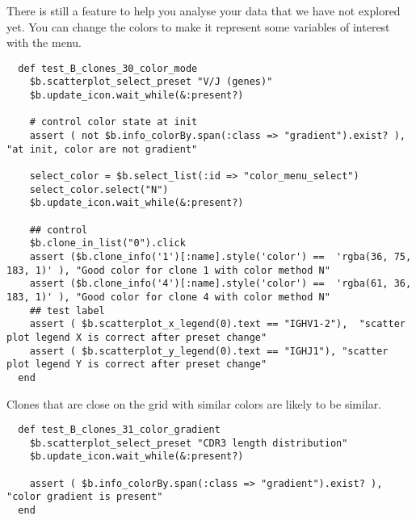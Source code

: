 There is still a feature to help you analyse your data that we have not
explored yet.
You can change the colors to make it represent some variables of interest
with the  menu.
\begin{verbatim}
  def test_B_clones_30_color_mode
    $b.scatterplot_select_preset "V/J (genes)"
    $b.update_icon.wait_while(&:present?)

    # control color state at init
    assert ( not $b.info_colorBy.span(:class => "gradient").exist? ), "at init, color are not gradient"

    select_color = $b.select_list(:id => "color_menu_select")
    select_color.select("N")
    $b.update_icon.wait_while(&:present?)
    
    ## control
    $b.clone_in_list("0").click
    assert ($b.clone_info('1')[:name].style('color') ==  'rgba(36, 75, 183, 1)' ), "Good color for clone 1 with color method N"
    assert ($b.clone_info('4')[:name].style('color') ==  'rgba(61, 36, 183, 1)' ), "Good color for clone 4 with color method N"
    ## test label
    assert ( $b.scatterplot_x_legend(0).text == "IGHV1-2"),  "scatter plot legend X is correct after preset change"
    assert ( $b.scatterplot_y_legend(0).text == "IGHJ1"), "scatter plot legend Y is correct after preset change"
  end
\end{verbatim}
  
Clones that are close on the grid with similar colors are likely to
be similar.

\begin{verbatim}
  def test_B_clones_31_color_gradient
    $b.scatterplot_select_preset "CDR3 length distribution"
    $b.update_icon.wait_while(&:present?)

    assert ( $b.info_colorBy.span(:class => "gradient").exist? ), "color gradient is present"
  end
\end{verbatim}

